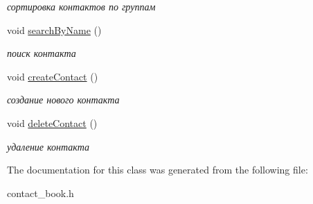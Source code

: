 \begin{DoxyCompactItemize}
\begin{DoxyCompactList}\small\item\em сортировка контактов по группам \end{DoxyCompactList}\item 
void \hyperlink{class_contact__book_a24098029bd43084be06c8cc1e39ad3a5}{search\+By\+Name} ()\hypertarget{class_contact__book_a24098029bd43084be06c8cc1e39ad3a5}{}\label{class_contact__book_a24098029bd43084be06c8cc1e39ad3a5}

\begin{DoxyCompactList}\small\item\em поиск контакта \end{DoxyCompactList}\item 
void \hyperlink{class_contact__book_ac5f3978d948c18a0e88b8aa5354629ec}{create\+Contact} ()\hypertarget{class_contact__book_ac5f3978d948c18a0e88b8aa5354629ec}{}\label{class_contact__book_ac5f3978d948c18a0e88b8aa5354629ec}

\begin{DoxyCompactList}\small\item\em создание нового контакта \end{DoxyCompactList}\item 
void \hyperlink{class_contact__book_a5495a21b31e2f81aab7d761acce99f89}{delete\+Contact} ()\hypertarget{class_contact__book_a5495a21b31e2f81aab7d761acce99f89}{}\label{class_contact__book_a5495a21b31e2f81aab7d761acce99f89}

\begin{DoxyCompactList}\small\item\em удаление контакта \end{DoxyCompactList}\end{DoxyCompactItemize}


The documentation for this class was generated from the following file\+:\begin{DoxyCompactItemize}
\item 
contact\+\_\+book.\+h\end{DoxyCompactItemize}
